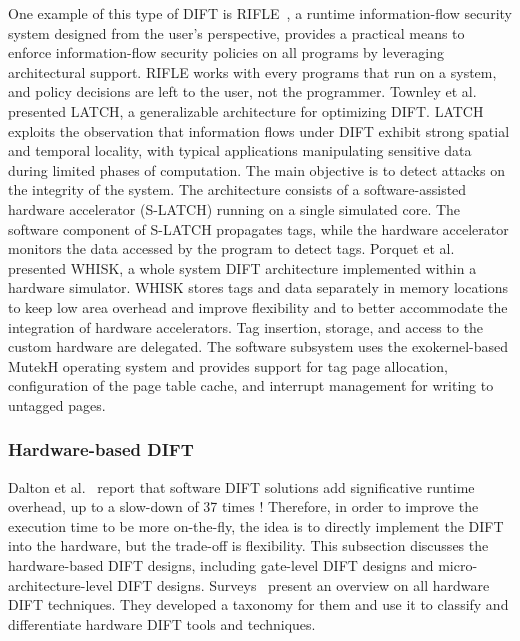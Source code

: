 One example of this type of DIFT is RIFLE~\cite{VBCROBRVA-04-micro}, a runtime information-flow security system designed from the user's perspective, provides a practical means to enforce information-flow security policies on all programs by leveraging architectural support. RIFLE works with every programs that run on a system, and policy decisions are left to the user, not the programmer.
Townley et al.~\cite{TKPAY-19-micro} presented LATCH, a generalizable architecture for optimizing DIFT. 
LATCH exploits the observation that information flows under DIFT exhibit strong spatial and temporal locality, with typical applications manipulating sensitive data during limited phases of computation. The main objective is to detect attacks on the integrity of the system. The architecture consists of a software-assisted hardware accelerator (S-LATCH) running on a single simulated core. The software component of S-LATCH propagates tags, while the hardware accelerator monitors the data accessed by the program to detect tags. 
Porquet et al.~\cite{PS-13-codes} presented WHISK, a whole system DIFT architecture implemented within a hardware simulator. WHISK stores tags and data separately in memory locations to keep low area overhead and improve flexibility and to better accommodate the integration of hardware accelerators. Tag insertion, storage, and access to the custom hardware are delegated. The software subsystem uses the exokernel-based MutekH operating system and provides support for tag page allocation, configuration of the page table cache, and interrupt management for writing to untagged pages.

\subsubsection{Hardware-based DIFT}
Dalton et al.~\cite{DKK-07-sigarch} report that software DIFT solutions add significative runtime overhead, up to a slow-down of 37 times ! Therefore, in order to improve the execution time to be more on-the-fly, the idea is to directly implement the DIFT into the hardware, but the trade-off is flexibility.
This subsection discusses the hardware-based DIFT designs, including gate-level DIFT designs and micro-architecture-level DIFT designs. Surveys~\cite{HAK-21-acmcsur,BSMCVEJCO-21-acmcsur} present an overview on all hardware DIFT techniques. They developed a taxonomy for them and use it to classify and differentiate hardware DIFT tools and techniques.

